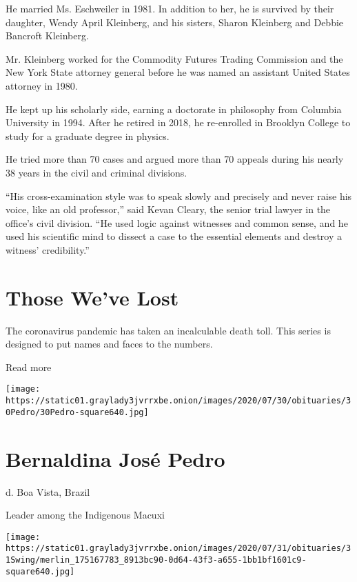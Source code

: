 He married Ms. Eschweiler in 1981. In addition to her, he is survived by
their daughter, Wendy April Kleinberg, and his sisters, Sharon Kleinberg
and Debbie Bancroft Kleinberg.

Mr. Kleinberg worked for the Commodity Futures Trading Commission and
the New York State attorney general before he was named an assistant
United States attorney in 1980.

He kept up his scholarly side, earning a doctorate in philosophy from
Columbia University in 1994. After he retired in 2018, he re-enrolled in
Brooklyn College to study for a graduate degree in physics.

He tried more than 70 cases and argued more than 70 appeals during his
nearly 38 years in the civil and criminal divisions.

``His cross-examination style was to speak slowly and precisely and
never raise his voice, like an old professor,'' said Kevan Cleary, the
senior trial lawyer in the office's civil division. ``He used logic
against witnesses and common sense, and he used his scientific mind to
dissect a case to the essential elements and destroy a witness'
credibility.''

\href{https://www.nytimes3xbfgragh.onion/interactive/2020/obituaries/people-died-coronavirus-obituaries.html?action=click\&pgtype=Article\&state=default\&region=BELOW_MAIN_CONTENT\&context=covid_obits_promo}{}

\hypertarget{those-weve-lost}{%
\section{Those We've Lost}\label{those-weve-lost}}

The coronavirus pandemic has taken an incalculable death toll. This
series is designed to put names and faces to the numbers.

Read more

\texttt{[image: https://static01.graylady3jvrrxbe.onion/images/2020/07/30/obituaries/30Pedro/30Pedro-square640.jpg]}

\hypertarget{bernaldina-josuxe9-pedro}{%
\section{Bernaldina José Pedro}\label{bernaldina-josuxe9-pedro}}

d. Boa Vista, Brazil

Leader among the Indigenous Macuxi

\texttt{[image: https://static01.graylady3jvrrxbe.onion/images/2020/07/31/obituaries/31Swing/merlin\_175167783\_8913bc90-0d64-43f3-a655-1bb1bf1601c9-square640.jpg]}

